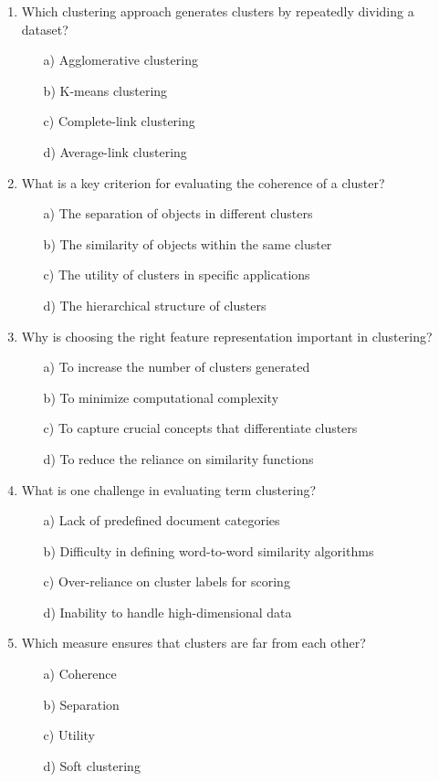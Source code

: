 \documentclass[8pt]{extarticle}
\begin{document}
\begin{multicols}{2}
\begin{enumerate}
\item Which clustering approach generates clusters by repeatedly dividing a dataset?
\begin{itemize}
\item[a)] Agglomerative clustering
\item[b)] K-means clustering
\item[c)] Complete-link clustering
\item[d)] Average-link clustering
\end{itemize}

\item What is a key criterion for evaluating the coherence of a cluster?
\begin{itemize}
\item[a)] The separation of objects in different clusters
\item[b)] The similarity of objects within the same cluster
\item[c)] The utility of clusters in specific applications
\item[d)] The hierarchical structure of clusters
\end{itemize}

\item Why is choosing the right feature representation important in clustering?
\begin{itemize}
\item[a)] To increase the number of clusters generated
\item[b)] To minimize computational complexity
\item[c)] To capture crucial concepts that differentiate clusters
\item[d)] To reduce the reliance on similarity functions
\end{itemize}

\item What is one challenge in evaluating term clustering?
\begin{itemize}
\item[a)] Lack of predefined document categories
\item[b)] Difficulty in defining word-to-word similarity algorithms
\item[c)] Over-reliance on cluster labels for scoring
\item[d)] Inability to handle high-dimensional data
\end{itemize}

\item Which measure ensures that clusters are far from each other?
\begin{itemize}
\item[a)] Coherence
\item[b)] Separation
\item[c)] Utility
\item[d)] Soft clustering
\end{itemize}


\end{enumerate}
\end{multicols}
\end{document}
